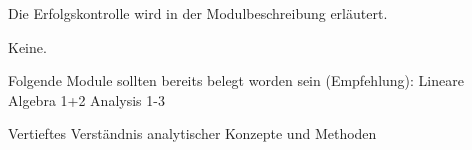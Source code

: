 \begin{course}

\setdoclanguagegerman
{}


\courselevel{}
\courseinstructionlanguage{}

\coursehead


\label{cour_8009.dp_997}


\begin{styleenv}
\begin{assessment}
Die Erfolgskontrolle wird in der Modulbeschreibung erläutert.


\end{assessment}

\begin{conditions}Keine.\end{conditions}

\begin{recommendations}Folgende Module sollten bereits belegt worden sein (Empfehlung):\newline
Lineare Algebra 1+2\newline
Analysis 1-3

\end{recommendations}
\end{styleenv}

\begin{learningoutcomes}
Vertieftes Verständnis analytischer Konzepte und Methoden


\end{learningoutcomes}


\end{course}
